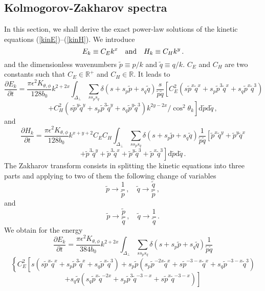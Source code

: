 \documentclass{jpp}
\def\be{\begin{equation}}
\def\ee{\end{equation}}
\def\dd{\mathrm{d}}
\def\RR{{\mathbb{R}}}
\begin{document}
\subsection{Kolmogorov-Zakharov spectra}
In this section, we shall derive the exact power-law solutions of the kinetic equations (\ref{kinE})--(\ref{kinH}). We introduce 
\be \label{ECK}
E_k \equiv C_E k^x \quad {\rm and} \quad H_k \equiv C_H k^y \, .
\ee
and the dimensionless wavenumbers $\tilde p \equiv p/k$ and $\tilde q \equiv q/k$. 
$C_E$ and $C_H$ are two constants such that $C_E \in \RR^+$ and $C_H \in \RR$. It leads to
\be \label{kinE2}
\frac{\partial E_k}{\partial t} = 
\frac{\pi \epsilon^{2} K_{\theta,\phi}}{128 b_0} k^{2+2x} \int_{\Delta_\perp} \sum_{ss_{p} s_{q}}  
\delta(s+s_p \tilde p+s_q \tilde q)\frac{s}{\tilde p \tilde q} 
\left[ C_E^2 \left( s {\tilde p}^x {\tilde q}^x + s_p {\tilde p}^3 {\tilde q}^x + s_q {\tilde p}^x {\tilde q}^3 \right) \right.
\ee
$$
+ \left. C_H^2 \left( s{\tilde p}^y {\tilde q}^y + s_p{\tilde p}^3 {\tilde q}^y + s_q{\tilde p}^y {\tilde q}^3 \right) k^{2y-2x} / \cos^2 \theta_k 
 \right] \dd {\tilde p} \dd {\tilde q} \, ,  
$$
and 
\be \label{kinH2}
\frac{\partial H_k}{\partial t} = 
\frac{\pi \epsilon^{2} K_{\theta,\phi}}{128 b_0} k^{x+y+2} C_E C_H \int_{\Delta_\perp} \sum_{ss_{p} s_{q}}  
\delta(s+s_p \tilde p+s_q \tilde q)\frac{1}{\tilde p \tilde q} 
\left[ {\tilde p}^x {\tilde q}^y + {\tilde p}^y {\tilde q}^x \right.
\ee
$$
\left. + {\tilde p}^3 {\tilde q}^y + {\tilde p}^3 {\tilde q}^x + {\tilde p}^y {\tilde q}^3 + {\tilde p}^x {\tilde q}^3 
\right]  \dd \tilde p \dd \tilde q \, .
$$
The Zakharov transform \citep{ZLF92} consists in splitting the kinetic equations into three parts and applying to two of them the following change of variables
\be
\tilde p \to \frac{1}{\tilde p} \, , \quad \tilde q \to \frac{\tilde q}{\tilde p} \, , \label{TZ1}
\ee
and
\be
\tilde p \to \frac{\tilde p}{\tilde q} \, , \quad \tilde q \to \frac{1}{\tilde q} \, . \label{TZ2}
\ee
We obtain for the energy
\be \label{kinE3}
\frac{\partial E_k}{\partial t} = 
\frac{\pi \epsilon^{2} K_{\theta,\phi}}{384 b_0} k^{2+2x} \int_{\Delta_\perp} \sum_{ss_{p} s_{q}}  
\delta(s+s_p \tilde p+s_q \tilde q)\frac{1}{\tilde p \tilde q} 
\ee
$$
\left\{ C_E^2 \left[ s \left( s {\tilde p}^x {\tilde q}^x + s_p {\tilde p}^3 {\tilde q}^x + s_q {\tilde p}^x {\tilde q}^3 \right) 
+ s_p {\tilde p} \left( s_p {\tilde p}^{-2x} {\tilde q}^x + s {\tilde p}^{-3-x} {\tilde q}^x + s_q {\tilde p}^{-3-x} {\tilde q}^3 \right) \right. \right.
$$
$$
\left.  + s_q {\tilde q} \left( s_q {\tilde p}^{x} {\tilde q}^{-2x} + s_p {\tilde p}^3 {\tilde q}^{-3-x} + s {\tilde p}^x {\tilde q}^{-3-x} \right) \right]
$$
\end{document}
